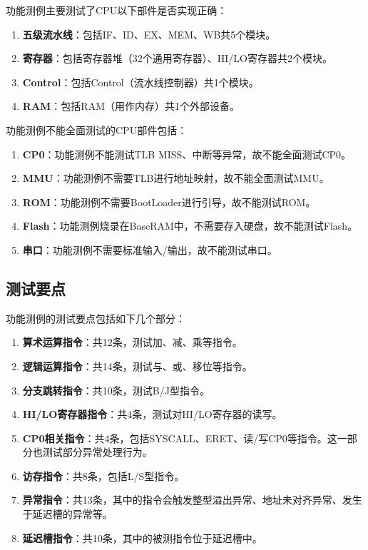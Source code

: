
功能测例主要测试了CPU以下部件是否实现正确：

\begin{enumerate}
    \item {\bf 五级流水线}：包括IF、ID、EX、MEM、WB共5个模块。
    \item {\bf 寄存器}：包括寄存器堆（32个通用寄存器）、HI/LO寄存器共2个模块。
    \item {\bf Control}：包括Control（流水线控制器）共1个模块。
    \item {\bf RAM}：包括RAM（用作内存）共1个外部设备。
\end{enumerate}

功能测例不能全面测试的CPU部件包括：

\begin{enumerate}
    \item {\bf CP0}：功能测例不能测试TLB MISS、中断等异常，故不能全面测试CP0。
    \item {\bf MMU}：功能测例不需要TLB进行地址映射，故不能全面测试MMU。
    \item {\bf ROM}：功能测例不需要BootLoader进行引导，故不能测试ROM。
    \item {\bf Flash}：功能测例烧录在BaseRAM中，不需要存入硬盘，故不能测试Flash。
    \item {\bf 串口}：功能测例不需要标准输入/输出，故不能测试串口。
\end{enumerate}

\subsection{测试要点}

功能测例的测试要点包括如下几个部分：

\begin{enumerate}
    \item {\bf 算术运算指令}：共12条，测试加、减、乘等指令。
    \item {\bf 逻辑运算指令}：共14条，测试与、或、移位等指令。
    \item {\bf 分支跳转指令}：共10条，测试B/J型指令。
    \item {\bf HI/LO寄存器指令}：共4条，测试对HI/LO寄存器的读写。
    \item {\bf CP0相关指令}：共4条，包括SYSCALL、ERET、读/写CP0等指令。这一部分也测试部分异常处理行为。
    \item {\bf 访存指令}：共8条，包括L/S型指令。
    \item {\bf 异常指令}：共13条，其中的指令会触发整型溢出异常、地址未对齐异常、发生于延迟槽的异常等。
    \item {\bf 延迟槽指令}：共10条，其中的被测指令位于延迟槽中。
\end{enumerate}


